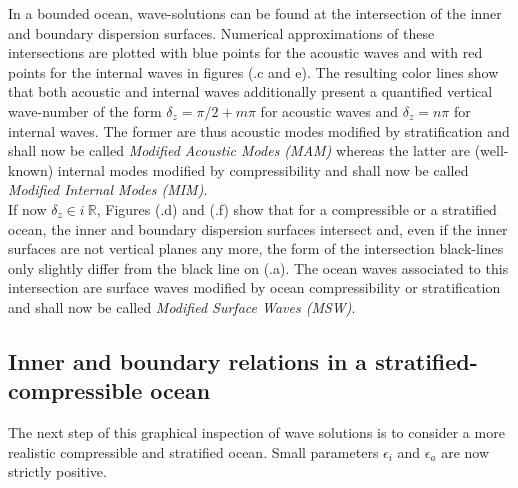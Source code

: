 \documentclass[a4paper,11pt]{article}
\begin{document}
In a bounded ocean, wave-solutions can be found at the intersection of the inner and boundary dispersion surfaces. Numerical approximations of these intersections are plotted with blue points for the acoustic waves and with red points for the internal waves in figures (.c and e). The resulting color lines show that both acoustic and internal waves additionally present a quantified vertical wave-number of the form $\delta_z=\pi/2+m\pi$ for acoustic waves and $\delta_z=n\pi$ for internal waves. The former are thus acoustic modes modified by stratification and shall now be called \textit{Modified Acoustic Modes (MAM)} whereas the latter are (well-known) internal modes modified by compressibility and shall now be called \textit{Modified Internal Modes (MIM)}.\\

If now $\delta_z\in i\ \mathbb{R}$, Figures (.d) and (.f) show that for a compressible or a stratified ocean, the inner and boundary dispersion surfaces intersect and, even if the inner surfaces are not vertical planes any more, the form of the intersection black-lines only slightly differ from the black line on (.a). The ocean waves associated to this intersection are surface waves modified by ocean compressibility or stratification and shall now be called \textit{Modified Surface Waves (MSW)}.\\ 

\subsection{Inner and boundary relations in a stratified-compressible ocean}
\label{SubSectionPotBranches}

The next step of this graphical inspection of wave solutions is to consider a more realistic compressible and stratified ocean. Small parameters $\epsilon_i$ and $\epsilon_a$ are now strictly positive.\\
\end{document}
